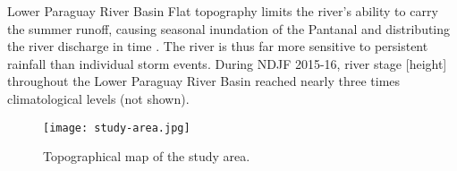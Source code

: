 \begin{block}{Lower Paraguay River Basin}
  Flat topography limits the river's ability to carry the summer runoff, causing seasonal inundation of the Pantanal and distributing the river discharge in time \cite{Bravo:2011et,Barros:2004bn}.
  The river is thus far more sensitive to persistent rainfall than individual storm events.
  During NDJF 2015-16, river stage [height] throughout the Lower Paraguay River Basin reached nearly three times climatological levels (not shown).
  \begin{mdframed}
  \begin{figure}
  	\noindent\texttt{[image: study-area.jpg]}
  	\caption{
  		Topographical map of the study area.
  	}
    \label{fig:study-area}
  \end{figure}
  \end{mdframed}
\end{block}
